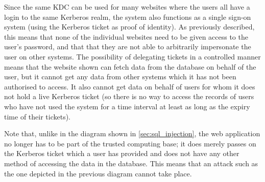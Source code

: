 \documentclass[12pt]{report}
\begin{document}
\begin{center}
\end{center}

Since the same KDC can be used for many websites where the users all have a login to the same Kerberos realm, the system also functions as a single sign-on system (using the Kerberos ticket as proof of identity). As previously described, this means that none of the individual websites need to be given access to the user's password, and that that they are not able to arbitrarily impersonate the user on other systems. The possibility of delegating tickets in a controlled manner means that the website shown can fetch data from the database on behalf of the user, but it cannot get any data from other systems which it has not been authorised to access. It also cannot get data on behalf of users for whom it does not hold a live Kerberos ticket (so there is no way to access the records of users who have not used the system for a time interval at least as long as the expiry time of their tickets).

Note that, unlike in the diagram shown in \autoref{sec:sql_injection}, the web application no longer has to be part of the trusted computing base; it does merely passes on the Kerberos ticket which a user has provided and does not have any other method of accessing the data in the database. This means that an attack such as the one depicted in the previous diagram cannot take place.
\end{document}
